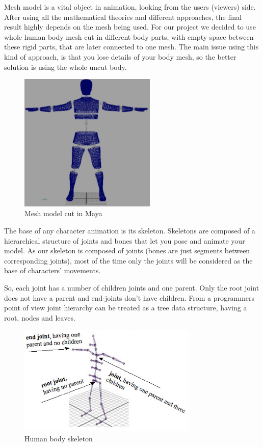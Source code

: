 \documentclass[times, 10pt,twocolumn]{article}
\begin{document}

Mesh model is a vital object in animation, looking from the users (viewers) side.
After using all the mathematical theories and different approaches, the final result
highly depends on the mesh being used.
For our project we decided to use whole human body mesh cut in different body parts,
with empty space between these rigid parts, that are later connected to one mesh.
The main issue using this kind of approach, is that you lose details of your body mesh,
so the better solution is using the whole uncut body.

\begin{figure}[H]
  \caption{Mesh model cut in Maya}
  \label{img_maya_mesh}
  \centering
  \includegraphics[width=65mm]{images/maya_cut.jpg}
\end{figure}


\label{Animating_human_body}

The base of any character animation is its skeleton. Skeletons are composed of a hierarchical structure of joints and bones that let you pose and animate your model. As our skeleton is composed of joints (bones are just  segments between corresponding joints), most of the time only the joints will be considered as the base of characters' movements.

So, each joint has a number of children joints and one parent. Only the root joint does not have a parent and end-joints don't have children. From a programmers point of view joint hierarchy can be treated as a tree data structure, having a root, nodes and leaves.

\begin{figure}[H]
  \caption{Human body skeleton}
  \centering
  \includegraphics[width=85mm]{images/bodySkeleton.jpg}
\end{figure}
\end{document}
